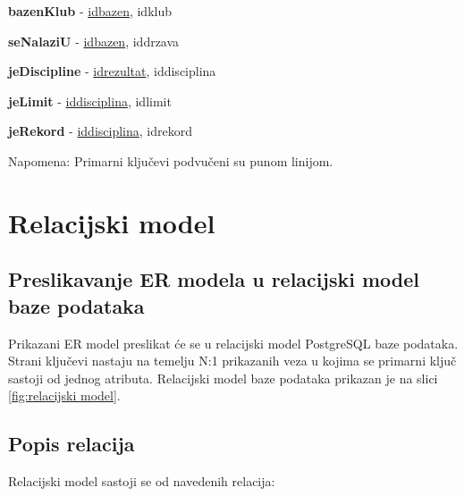 \documentclass[times, utf8, zavrsni]{fer}
\begin{document}
\textbf{bazenKlub} - \underline{idbazen}, idklub

\vspace{\baselineskip}

\textbf{seNalaziU} - \underline{idbazen}, iddrzava 

\vspace{\baselineskip}

\textbf{jeDiscipline} - \underline{idrezultat}, iddisciplina

\vspace{\baselineskip}

\textbf{jeLimit} - \underline{iddisciplina}, idlimit 

\vspace{\baselineskip}

\textbf{jeRekord} - \underline{iddisciplina}, idrekord

\vspace{\baselineskip}

Napomena: Primarni ključevi podvučeni su punom linijom.

\vspace{\baselineskip}


\section{Relacijski model}

\subsection{Preslikavanje ER modela u relacijski model baze podataka}

Prikazani ER model preslikat će se u relacijski model PostgreSQL baze podataka. Strani ključevi nastaju na temelju
N:1 prikazanih veza u kojima se primarni ključ sastoji od jednog atributa. Relacijski model baze podataka prikazan je
na slici \ref{fig:relacijski model}.

\subsection{Popis relacija}

\vspace{\baselineskip}

Relacijski model sastoji se od navedenih relacija:

\vspace{\baselineskip}
\end{document}
